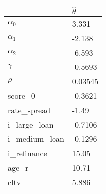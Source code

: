 \begin{tabular}{ll}
\hline 
  & $\hat{\theta}$ \\ 
\hline 
$\alpha_0$ & 3.331 \\ 
$\alpha_1$ & -2.138 \\ 
$\alpha_2$ & -6.593 \\ 
$\gamma$ & -0.5693 \\ 
$\rho$ & 0.03545 \\ 
score\_0 & -0.3621 \\ 
rate\_spread & -1.49 \\ 
i\_large\_loan & -0.7106 \\ 
i\_medium\_loan & -0.1296 \\ 
i\_refinance & 15.05 \\ 
age\_r & 10.71 \\ 
cltv & 5.886 \\ 
\hline 
\end{tabular}